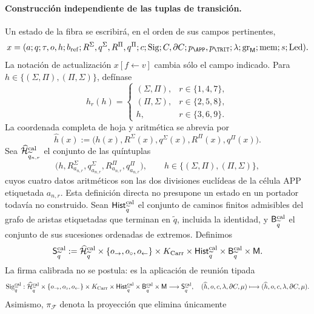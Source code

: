 \paragraph{Construcción independiente de las tuplas de transición.}
Un estado de la fibra se escribirá, en el orden de sus campos pertinentes,
\[
 x=(a;q;\tau,o,h;b_{\rm ref};
       R^\Sigma,q^\Sigma,R^\Pi,q^\Pi;c;
       \operatorname{Sig};C,\partial C;p_{\APP},p_{\TRIT};
       \lambda;\operatorname{gr}_{\mathsf M};\operatorname{mem};
       s;\operatorname{Led}).
\]
La notación de actualización \(x[f\leftarrow v]\) cambia sólo el campo
indicado. Para \(h\in\{(\Sigma,\Pi),(\Pi,\Sigma)\}\), defínase
\[
 h_r(h)=
 \begin{cases}
  (\Sigma,\Pi),&r\in\{1,4,7\},\\
  (\Pi,\Sigma),&r\in\{2,5,8\},\\
 h,&r\in\{3,6,9\}.
 \end{cases}
\]
La coordenada completa de hoja y aritmética se abrevia por
\[
 \widehat h(x):=
 \bigl(h(x),R^\Sigma(x),q^\Sigma(x),R^\Pi(x),q^\Pi(x)\bigr).
\]
Sea \(\widehat{\mathcal H}^{\rm cal}_{\widetilde q_{n,r}}\) el conjunto de
las quíntuplas
\[
 \bigl(h,R^\Sigma_{a_{n,r}},q^\Sigma_{a_{n,r}},
          R^\Pi_{a_{n,r}},q^\Pi_{a_{n,r}}\bigr),
 \qquad
 h\in\{(\Sigma,\Pi),(\Pi,\Sigma)\},
\]
cuyos cuatro datos aritméticos son las dos divisiones euclídeas de la célula
APP etiquetada \(a_{n,r}\). Esta definición directa no presupone un estado
en un portador todavía no construido. Sean
\(\mathsf{Hist}^{\rm cal}_{\widetilde q}\) el conjunto de caminos finitos
admisibles del grafo de aristas etiquetadas que terminan en
\(\widetilde q\), incluida la identidad, y
\(\mathsf B^{\rm cal}_{\widetilde q}\) el conjunto de sus sucesiones
ordenadas de extremos. Definimos
\[
 \mathsf S^{\rm cal}_{\widetilde q}:=
 \widehat{\mathcal H}^{\rm cal}_{\widetilde q}
 \times\{o_{\rightarrow},o_{\circ},o_{\leftarrow}\}
 \times K_{\rm Carr}\times
 \mathsf{Hist}^{\rm cal}_{\widetilde q}\times
 \mathsf B^{\rm cal}_{\widetilde q}\times\mathsf M .
\]
La firma calibrada no se postula: es la aplicación de reunión tipada
\[
 \operatorname{Sig}^{\rm cal}_{\widetilde q}:
 \widehat{\mathcal H}^{\rm cal}_{\widetilde q}
 \times\{o_{\rightarrow},o_{\circ},o_{\leftarrow}\}
 \times K_{\rm Carr}\times
 \mathsf{Hist}^{\rm cal}_{\widetilde q}\times
 \mathsf B^{\rm cal}_{\widetilde q}\times\mathsf M
 \longrightarrow\mathsf S^{\rm cal}_{\widetilde q},
\quad
 (\widehat h,o,c,\lambda,\partial C,\mu)
 \longmapsto(\widehat h,o,c,\lambda,\partial C,\mu).
\]
Asimismo, \(\pi_{\mathcal F}\) denota la proyección que elimina únicamente
